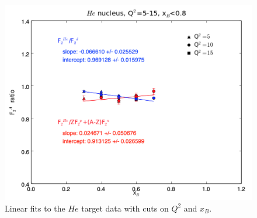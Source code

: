 \documentclass[oneside]{article}
\begin{document}
\begin{figure}[H]
\begin{minipage}{0.5\textwidth}
\includegraphics[width=\textwidth]{plots/q2_all_x_all/all_He.png}
\end{minipage}
  \caption[]{Linear fits to the $He$ target data with cuts on $Q^2$ and $x_B$.}
  \label{fig:fits_He}
\end{figure}   
\end{document}
